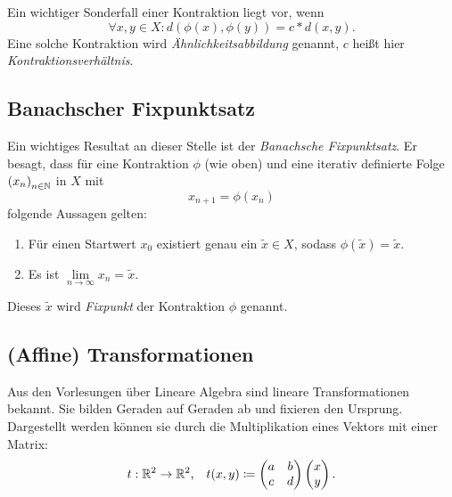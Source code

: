 \documentclass[afourpaper]{tufte-handout}
\begin{document}
Ein wichtiger Sonderfall einer Kontraktion liegt vor, wenn
\begin{equation*}
  \forall x,y \in X : d(\phi(x), \phi(y)) \bm{=} c * d(x,y)\text{.}
\end{equation*}
Eine solche Kontraktion wird \emph{Ähnlichkeitsabbildung} genannt, \( c \) heißt hier \emph{Kontraktionsverhältnis}.

\subsection{Banachscher Fixpunktsatz}

Ein wichtiges Resultat an dieser Stelle ist der \emph{Banachsche Fixpunktsatz}. Er besagt, dass für eine Kontraktion \( \phi \) (wie oben) und eine iterativ definierte Folge \( {(x_n)}_{n \in \mathbb{N}} \) in \( X \) mit
\begin{equation*}
  x_{n+1} = \phi(x_n)
\end{equation*}
folgende Aussagen gelten:
\begin{enumerate}
  \item Für einen  Startwert \( x_0 \) existiert genau ein \( \widetilde{x} \in X \), sodass \( \phi(\widetilde{x}) = \widetilde{x} \).
  \item Es ist \( \underset{n \to \infty}{\lim} x_n = \widetilde{x} \).
\end{enumerate}

Dieses \( \widetilde{x} \) wird \emph{Fixpunkt} der Kontraktion \( \phi \) genannt.

\subsection{(Affine) Transformationen}

Aus den Vorlesungen über Lineare Algebra sind lineare Transformationen bekannt. Sie bilden Geraden auf Geraden ab und fixieren den Ursprung. Dargestellt werden können sie durch die Multiplikation eines Vektors mit einer Matrix:
\begin{equation*}
  t: \mathbb{R}^2 \to \mathbb{R}^2\text{,} \quad t(x,y) \coloneqq \begin{pmatrix}
    a & b \\ c & d
  \end{pmatrix} \begin{pmatrix}
    x \\ y
  \end{pmatrix}\text{.}
\end{equation*}
\end{document}
